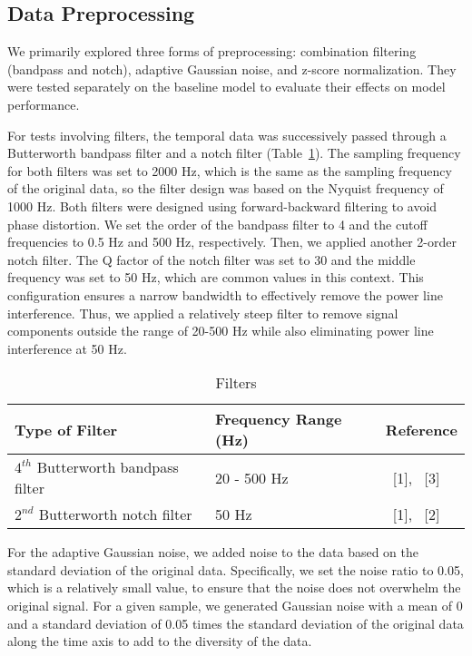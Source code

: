 \subsection{Data Preprocessing}

We primarily explored three forms of preprocessing: combination filtering (bandpass and notch), 
adaptive Gaussian noise, and z-score normalization.
They were tested separately on the baseline model to evaluate their effects on model performance.

For tests involving filters, the temporal data was successively passed through a Butterworth bandpass filter and a notch filter (Table~\ref{filters}).
The sampling frequency for both filters was set to 2000 Hz, which is the same as the sampling frequency of the original data,
so the filter design was based on the Nyquist frequency of 1000 Hz.
Both filters were designed using forward-backward filtering to avoid phase distortion.
We set the order of the bandpass filter to 4 and the cutoff frequencies to 0.5 Hz and 500 Hz, respectively.
Then, we applied another 2-order notch filter.
The Q factor of the notch filter was set to 30 and the middle frequency was set to 50 Hz, 
which are common values in this context. This configuration ensures a narrow bandwidth to effectively remove the power line interference.
Thus, we applied a relatively steep filter to remove signal components outside the range of 20-500 Hz 
while also eliminating power line interference at 50 Hz.

\begin{table}
    \caption{Filters}
    \label{filters}
    \centering
    \begin{tabular}{lll}
      \toprule
      \cmidrule(r){1-2}
      Type of Filter     & Frequency Range (Hz)     & Reference \\
      \midrule
      $4^{th}$ Butterworth bandpass filter & 20 - 500 Hz  &  ~[1], ~[3]    \\
      $2^{nd}$ Butterworth notch filter    & 50 Hz        &  ~[1], ~[2]    \\
      \bottomrule
    \end{tabular}
  \end{table}
  

For the adaptive Gaussian noise, we added noise to the data based on the standard deviation of the original data.
Specifically, we set the noise ratio to 0.05, which is a relatively small value, to ensure that the noise does not overwhelm the original signal.
For a given sample, we generated Gaussian noise with a mean of 0 and a standard deviation of 0.05 times the standard deviation of the original data
along the time axis to add to the diversity of the data.

